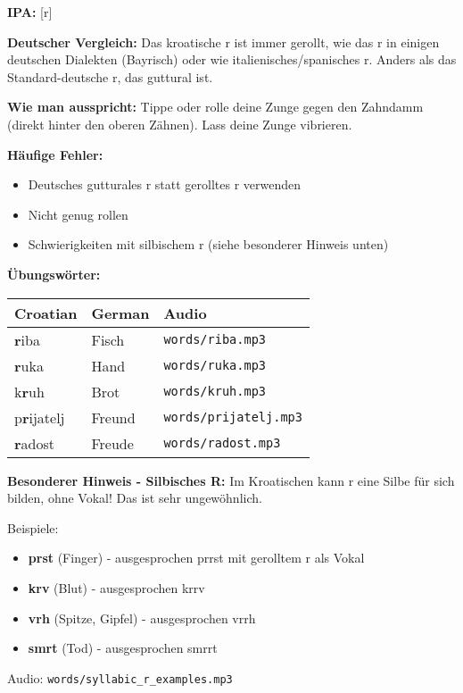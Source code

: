 \begin{tcolorbox}[colback=lightyellow!30, colframe=orange, title=\textbf{R, r}]

\textbf{IPA:} [r]

\textbf{Deutscher Vergleich:}
Das kroatische \glqq r\grqq{} ist immer gerollt, wie das \glqq r\grqq{} in einigen deutschen Dialekten (Bayrisch) oder wie italienisches/spanisches \glqq r\grqq{}. Anders als das Standard-deutsche \glqq r\grqq{}, das guttural ist.

\textbf{Wie man ausspricht:}
Tippe oder rolle deine Zunge gegen den Zahndamm (direkt hinter den oberen Zähnen). Lass deine Zunge vibrieren.

\textbf{Häufige Fehler:}
\begin{itemize}
    \item Deutsches gutturales \glqq r\grqq{} statt gerolltes \glqq r\grqq{} verwenden
    \item Nicht genug rollen
    \item Schwierigkeiten mit silbischem \glqq r\grqq{} (siehe besonderer Hinweis unten)
\end{itemize}

\textbf{Übungswörter:}
\begin{tabular}{lll}
\textbf{Croatian} & \textbf{German} & \textbf{Audio} \\
\midrule
\textbf{r}iba & Fisch & \texttt{words/riba.mp3} \\
\textbf{r}uka & Hand & \texttt{words/ruka.mp3} \\
k\textbf{r}uh & Brot & \texttt{words/kruh.mp3} \\
p\textbf{r}ijatelj & Freund & \texttt{words/prijatelj.mp3} \\
\textbf{r}adost & Freude & \texttt{words/radost.mp3} \\
\end{tabular}

\textbf{Besonderer Hinweis - Silbisches R:}
Im Kroatischen kann \glqq r\grqq{} eine Silbe für sich bilden, ohne Vokal! Das ist sehr ungewöhnlich.

Beispiele:
\begin{itemize}
    \item \textbf{prst} (Finger) - ausgesprochen \glqq prrst\grqq{} mit gerolltem r als Vokal
    \item \textbf{krv} (Blut) - ausgesprochen \glqq krrv\grqq{}
    \item \textbf{vrh} (Spitze, Gipfel) - ausgesprochen \glqq vrrh\grqq{}
    \item \textbf{smrt} (Tod) - ausgesprochen \glqq smrrt\grqq{}
\end{itemize}

Audio: \texttt{words/syllabic\_r\_examples.mp3}

\end{tcolorbox}

